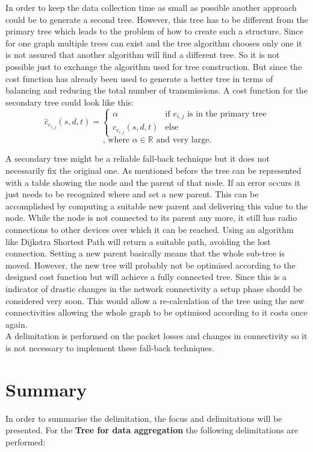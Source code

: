 In order to keep the data collection time as small as possible another approach could be to generate a second tree. However, this tree has to be different from the primary tree which leads to the problem of how to create such a structure. Since for one graph multiple trees can exist and the tree algorithm chooses only one it is not assured that another algorithm will find a different tree. So it is not possible just to exchange the algorithm used for tree construction. But since the cost function has already been used to generate a better tree in terms of balancing and reducing the total number of transmissions. A cost function for the secondary tree could look like this:
\begin{equation}
\hat{c}_{e_{i,j}}(s, d, t) = 
	\left\{
		\begin{array}{ll}
			\alpha  & \mbox{if } e_{i,j} \mbox{ is in the primary tree} \\
			c_{e_{i,j}}(s, d, t) & \mbox{else}
		\end{array}
	\right.
\end{equation}
$$
\mbox{, where } \alpha \in \mathbb{R} \mbox{ and very large.}
$$

A secondary tree might be a reliable fall-back technique but it does not necessarily fix the original one. As mentioned before the tree can be represented with a table showing the node and the parent of that node. If an error occurs it just needs to be recognized where and set a new parent. This can be accomplished by computing a suitable new parent and delivering this value to the node. While the node is not connected to its parent any more, it still has radio connections to other devices over which it can be reached. Using an algorithm like Dijkstra Shortest Path will return a suitable path, avoiding the lost connection. Setting a new parent basically means that the whole sub-tree is moved. However, the new tree will probably not be optimised according to the designed cost function but will achieve a fully connected tree. Since this is a indicator of drastic changes in the network connectivity a setup phase should be considered very soon. This would allow a re-calculation of the tree using the new connectivities allowing the whole graph to be optimised according to it costs once again.\\
A delimitation is performed on the packet losses and changes in connectivity so it is not necessary to implement these fall-back techniques.

\section{Summary}
In order to summarise the delimitation, the focus and delimitations will be presented. For the \textbf{Tree for data aggregation} the following delimitations are performed:

